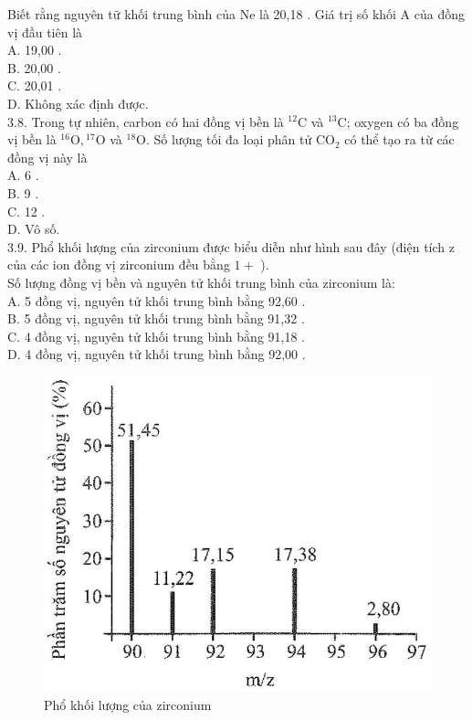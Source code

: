 \documentclass[10pt]{article}
\begin{document}
Biết rằng nguyên tữ khối trung bình của Ne là 20,18 . Giá trị số khối A của đồng vị đầu tiên là\\
A. 19,00 .\\
B. 20,00 .\\
C. 20,01 .\\
D. Không xác định được.\\
3.8. Trong tự nhiên, carbon có hai đồng vị bền là ${ }^{12} \mathrm{C}$ và ${ }^{13} \mathrm{C}$; oxygen có ba đồng vị bền là ${ }^{16} \mathrm{O},{ }^{17} \mathrm{O}$ và ${ }^{18} \mathrm{O}$. Số lượng tối đa loại phân tử $\mathrm{CO}_{2}$ có thể tạo ra từ các đồng vị này là\\
A. 6 .\\
B. 9 .\\
C. 12 .\\
D. Vô số.\\
3.9. Phổ khối lượng của zirconium được biểu diễn như hình sau đây (điện tích z của các ion đồng vị zirconium đều bằng $1+$ ).\\
Số lượng đồng vị bền và nguyên tử khối trung bình của zirconium là:\\
A. 5 đồng vị, nguyên tử khối trung bình bằng 92,60 .\\
B. 5 đồng vị, nguyên tử khối trung bình bằng 91,32 .\\
C. 4 đồng vị, nguyên tử khối trung bình bằng 91,18 .\\
D. 4 đồng vị, nguyên tử khối trung bình bằng 92,00 .

\begin{figure}[h]
\begin{center}
  \includegraphics[width=\textwidth]{2025_10_23_76620c17ffac1ae9b35bg-07(4)}
\captionsetup{labelformat=empty}
\caption{Phổ khối lượng của zirconium}
\end{center}
\end{figure}
\end{document}
